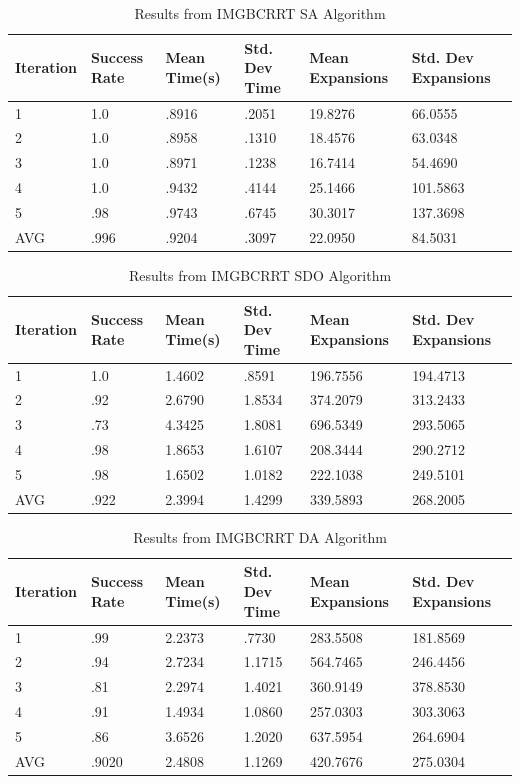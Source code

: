 \documentclass{article}
\begin{document}
\begin{table}[h]
  \caption{Results from IMGBCRRT SA Algorithm}
  \label{IMGBCRRT SA Results}
  \centering
  \begin{tabular}{llllll}
    \cmidrule(r){1-6}
   Iteration & Success Rate & Mean Time(s) & Std. Dev Time & Mean Expansions & Std. Dev Expansions\\
    \midrule
    1 & 1.0 & .8916 & .2051 & 19.8276 & 66.0555 \\
    2 & 1.0 & .8958 & .1310 & 18.4576 & 63.0348 \\
    3 & 1.0 & .8971 & .1238 & 16.7414 & 54.4690 \\
    4 & 1.0 & .9432 & .4144 & 25.1466 & 101.5863 \\
    5 & .98 & .9743 & .6745 & 30.3017 & 137.3698 \\
 \midrule
  AVG & .996 & .9204 & .3097 & 22.0950 & 84.5031 \\
    \bottomrule
  \end{tabular}
\end{table}

\begin{table}[h]
  \caption{Results from IMGBCRRT SDO Algorithm}
  \label{IMGBCRRT SDO Results}
  \centering
  \begin{tabular}{llllll}
    \cmidrule(r){1-6}
   Iteration & Success Rate & Mean Time(s) & Std. Dev Time & Mean Expansions & Std. Dev Expansions\\
    \midrule
    1 & 1.0 & 1.4602 & .8591 & 196.7556 & 194.4713 \\
    2 & .92 & 2.6790 & 1.8534 & 374.2079 & 313.2433 \\
    3 & .73 & 4.3425 & 1.8081 & 696.5349 & 293.5065 \\
    4 & .98 & 1.8653 & 1.6107 & 208.3444 & 290.2712 \\
    5 & .98 & 1.6502 & 1.0182 & 222.1038 & 249.5101 \\
 \midrule
  AVG & .922 & 2.3994 & 1.4299 & 339.5893 & 268.2005 \\
    \bottomrule
  \end{tabular}
\end{table}

\begin{table}[hbt!]
  \caption{Results from IMGBCRRT DA Algorithm}
  \label{IMGBCRRT DA Results}
  \centering
  \begin{tabular}{llllll}
    \cmidrule(r){1-6}
   Iteration & Success Rate & Mean Time(s) & Std. Dev Time & Mean Expansions & Std. Dev Expansions\\
    \midrule
    1 & .99 & 2.2373 & .7730 & 283.5508 & 181.8569 \\
    2 & .94 & 2.7234 & 1.1715 & 564.7465 & 246.4456 \\
    3 & .81 & 2.2974 & 1.4021 & 360.9149 & 378.8530 \\
    4 & .91 & 1.4934 & 1.0860 & 257.0303 & 303.3063 \\
    5 & .86 & 3.6526 & 1.2020 & 637.5954 & 264.6904 \\
 \midrule
  AVG & .9020 & 2.4808 & 1.1269 & 420.7676 & 275.0304 \\
    \bottomrule
  \end{tabular}
\end{table}
\end{document}
